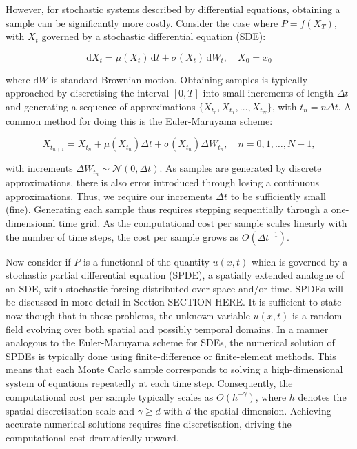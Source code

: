 However, for stochastic systems described by differential equations, obtaining a 
sample can be significantly more costly. Consider the case where $P=f(X_T)$, with 
$X_t$ governed by a stochastic differential equation (SDE):

\begin{equation*}
    \mathrm{d}X_t = \mu(X_t)\,\mathrm{d}t+\sigma(X_t)\,\mathrm{d}W_t,\quad X_0=x_0
\end{equation*}

where $\mathrm{d}W$ is standard Brownian motion. Obtaining samples is typically 
approached by discretising the interval $[0,T]$ into 
small increments of length $\Delta t$ and generating a sequence of approximations 
$\{X_{t_0}, X_{t_1}, \dots, X_{t_N}\}$, with $t_n = n \Delta t$. A common 
method for doing this is the Euler-Maruyama scheme:

\begin{equation}\label{eq:euler_maruyama}
    X_{t_{n+1}}=X_{t_n}+\mu(X_{t_n})\Delta t+\sigma(X_{t_n})\Delta W_{t_n},\quad n=0,1,\dots,N-1,
\end{equation}

with increments $\Delta W_{t_n} \sim \mathcal{N}(0, \Delta t)$. As samples are generated 
by discrete approximations, there is also error introduced through losing a continuous 
approximations. Thus, we require our increments $\Delta t$ to be sufficiently small (fine).
Generating each sample thus requires stepping sequentially through a one-dimensional
time grid.
As the computational cost per sample scales linearly with the number of time steps, 
the cost per sample grows as $O(\Delta t^{-1})$.

Now consider if $P$ is a functional of the quantity $u(x,t)$ which is 
governed by a stochastic partial differential equation (SPDE), a spatially extended
analogue of an SDE, with stochastic forcing distributed over space and/or time. 
SPDEs will be discussed in more detail in Section SECTION HERE.
It is sufficient to state now though that in these problems, 
the unknown variable $u(x,t)$ is a random field
evolving over both spatial and possibly temporal domains. In a manner analogous 
to the Euler-Maruyama scheme for SDEs, the numerical solution of SPDEs
is typically done using finite-difference or finite-element methods. This means 
that each Monte Carlo sample corresponds to solving a high-dimensional system of
equations repeatedly at each time step. Consequently, the computational 
cost per sample typically scales as $O(h^{-\gamma})$, where $h$ denotes the 
spatial discretisation scale and $\gamma \ge d$ with $d$ the 
spatial dimension. Achieving accurate numerical solutions requires fine discretisation,
driving the computational cost dramatically upward.

